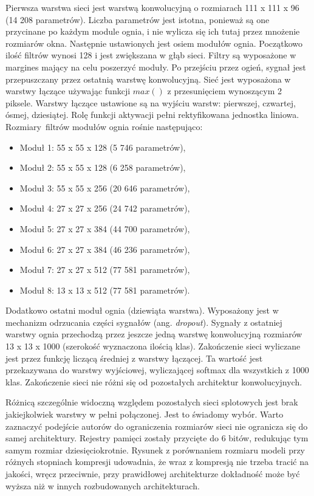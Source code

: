 \documentclass[12pt,a4paper,twoside,titlepage,openright]{book}
\begin{document}
\begin{itemize}
\begin{itemize}
Pierwsza warstwa sieci jest warstwą konwolucyjną o rozmiarach 111 x 111 x 96 (14 208 parametrów). Liczba parametrów jest istotna, ponieważ są one przycinane po każdym module ognia, i nie wylicza się ich tutaj przez mnożenie rozmiarów okna. Następnie ustawionych jest osiem modułów ognia. Początkowo ilość filtrów wynosi 128 i jest zwiększana w głąb sieci. Filtry są wyposażone w margines mający na celu poszerzyć moduły. Po przejściu przez ogień, sygnał jest przepuszczany przez ostatnią warstwę konwolucyjną. Sieć jest wyposażona w warstwy łączące używając funkcji $max()$ z przesunięciem wynoszącym 2 piksele. Warstwy łączące ustawione są na wyjściu warstw: pierwszej, czwartej, ósmej, dziesiątej. Rolę funkcji aktywacji pełni rektyfikowana jednostka liniowa. Rozmiary filtrów modułów ognia rośnie następująco:
\begin{itemize}
\item Moduł 1: 55 x 55 x 128 (5 746 parametrów),
\item Moduł 2: 55 x 55 x 128 (6 258 parametrów), 
\item Moduł 3: 55 x 55 x 256 (20 646 parametrów),
\item Moduł 4: 27 x 27 x 256 (24 742 parametrów),
\item Moduł 5: 27 x 27 x 384 (44 700 parametrów),
\item Moduł 6: 27 x 27 x 384 (46 236 parametrów),
\item Moduł 7: 27 x 27 x 512 (77 581 parametrów),
\item Moduł 8: 13 x 13 x 512 (77 581 parametrów).
\end{itemize}
Dodatkowo ostatni moduł ognia (dziewiąta warstwa). Wyposażony jest w mechanizm odrzucania części sygnałów (ang. \textit{dropout}). Sygnały z ostatniej warstwy ognia przechodzą przez jeszcze jedną warstwę konwolucyjną rozmiarów 13 x 13 x 1000 (szerokość wyznaczona ilością klas).
Zakończenie sieci wyliczane jest przez funkcję liczącą średniej z warstwy łączącej. Ta wartość jest przekazywana do warstwy wyjściowej, wyliczającej softmax dla wszystkich z 1000 klas. Zakończenie sieci nie różni się od pozostałych architektur konwolucyjnych.

Różnicą szczególnie widoczną względem pozostałych sieci splotowych jest brak jakiejkolwiek warstwy w pełni połączonej. Jest to świadomy wybór. Warto zaznaczyć podejście autorów do ograniczenia rozmiarów sieci nie ogranicza się do samej architektury. Rejestry pamięci zostały przycięte do 6 bitów, redukując tym samym rozmiar dziesięciokrotnie. Rysunek z porównaniem rozmiaru modeli przy różnych stopniach kompresji udowadnia, że wraz z kompresją nie trzeba tracić na jakości, wręcz przeciwnie, przy prawidłowej architekturze dokładność może być wyższa niż w innych rozbudowanych architekturach. \cite{DBLP:journals/corr/IandolaMAHDK16}


\end{itemize}
\end{itemize}
\end{document}
